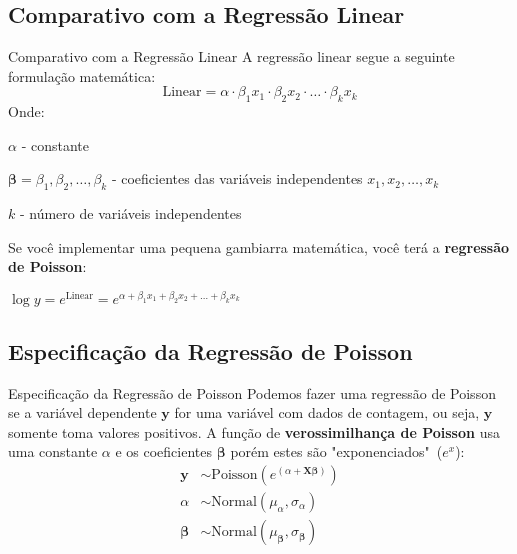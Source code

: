 \subsection{Comparativo com a Regressão Linear}
\begin{frame}{Comparativo com a Regressão Linear}
    A regressão linear segue a seguinte formulação matemática:
    \small
    $$
    \text{Linear} = \alpha \cdot \beta_1 x_1 \cdot \beta_2 x_2 \cdot \ldots \cdot \beta_k x_k
    $$
    Onde:
    \begin{vfilleditems}
        \item \small $\alpha$ - constante
        \item \small $\boldsymbol{\beta} = \beta_1, \beta_2, \dots, \beta_k$ - coeficientes das variáveis independentes $x_1, x_2, \dots, x_k$
        \item \small $k$ - número de variáveis independentes
    \end{vfilleditems}
    Se você implementar uma pequena gambiarra matemática, você terá a \textbf{regressão de Poisson}:
    \begin{vfilleditems}
        \item \small $\log{y} = e^{\text{Linear}} = e^{\alpha + \beta_1 x_1 + \beta_2 x_2 + \ldots + \beta_k x_k}$
    \end{vfilleditems}
\end{frame}

\subsection{Especificação da Regressão de Poisson}
\begin{frame}{Especificação da Regressão de Poisson}
    Podemos fazer uma regressão de Poisson se a variável dependente
    $\boldsymbol{y}$ for uma variável com dados de contagem, ou seja,
    $\boldsymbol{y}$ somente toma valores positivos. A função de \textbf{verossimilhança de
    Poisson} usa uma constante $\alpha$ e os coeficientes $\boldsymbol{\beta}$
    porém estes são "exponenciados"~($e^x$):
    $$
    \begin{aligned}
    \boldsymbol{y} &\sim \text{Poisson}\left( e^{(\alpha +  \mathbf{X} \boldsymbol{\beta})} \right) \\
    \alpha &\sim \text{Normal}(\mu_\alpha, \sigma_\alpha) \\
    \boldsymbol{\beta} &\sim \text{Normal}(\mu_{\boldsymbol{\beta}}, \sigma_{\boldsymbol{\beta}})
    \end{aligned}
    $$
\end{frame}

